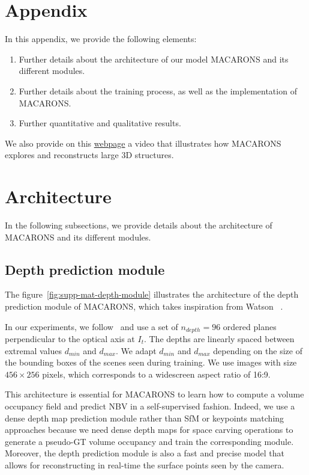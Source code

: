 \appendix
\section*{Appendix}
In this appendix, we provide the following elements:
\begin{enumerate}
    \item Further details about the architecture of our model MACARONS and its different modules.
    \item Further details about the training process, as well as the implementation of MACARONS.
    \item Further quantitative and qualitative results.
\end{enumerate}
We also provide on this \href{https://imagine.enpc.fr/~guedona/MACARONS/}{webpage} a video that illustrates how MACARONS explores and reconstructs large 3D structures.

\section{Architecture}

In the following subsections, we provide details about the architecture of MACARONS and its different modules.

\subsection{Depth prediction module}



The figure~\ref{fig:supp-mat-depth-module} illustrates the architecture of the depth prediction module of MACARONS, which takes inspiration from Watson \etal~\cite{watson-cvpr21-temporal-opportunist-manydepth}.

In our experiments, we follow~\cite{watson-cvpr21-temporal-opportunist-manydepth} and use a set of $n_{depth} = 96$ ordered planes perpendicular to the optical axis at $I_t$. The depths are linearly spaced between extremal values $d_{min}$ and $d_{max}$. We adapt $d_{min}$ and $d_{max}$ depending on the size of the bounding boxes of the scenes seen during training. We use images with size $456 \times 256$ pixels, which corresponds to a widescreen aspect ratio of 16:9.

This architecture is essential for MACARONS to learn how to compute a volume occupancy field and predict NBV in a self-supervised fashion. Indeed, we use a dense depth map prediction module rather than SfM or keypoints matching approaches because we need dense depth maps for space carving operations to generate a pseudo-GT volume occupancy and train the corresponding module.
Moreover, the depth prediction module is also a fast and precise model that allows for reconstructing in real-time the surface points seen by the camera.
%

